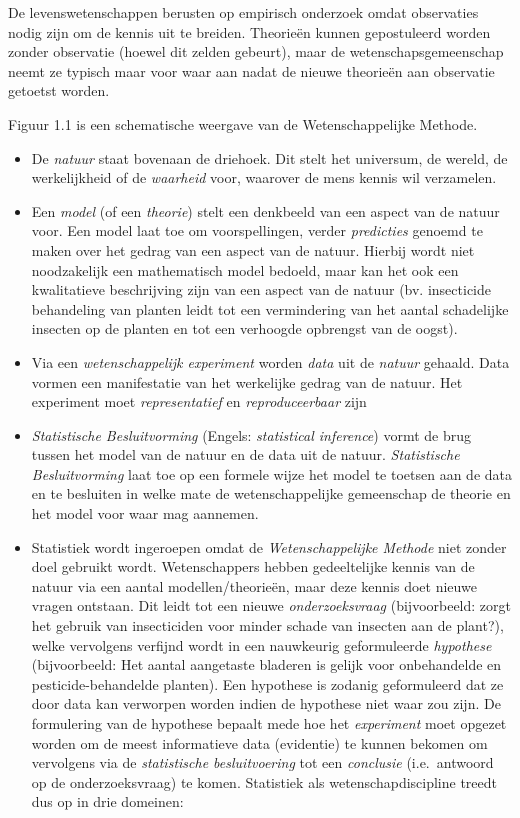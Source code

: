 \documentclass[12pt,dutch,coursenotes]{book}
\theoremstyle{definition}
\theoremstyle{definition}
\theoremstyle{definition}
\theoremstyle{remark}
\begin{document}
De levenswetenschappen berusten op empirisch onderzoek omdat observaties
nodig zijn om de kennis uit te breiden. Theorieën kunnen gepostuleerd
worden zonder observatie (hoewel dit zelden gebeurt), maar de
wetenschapsgemeenschap neemt ze typisch maar voor waar aan nadat de
nieuwe theorieën aan observatie getoetst worden.

Figuur 1.1 is een schematische weergave van de Wetenschappelijke
Methode.

\begin{itemize}
\item
  De \emph{natuur} staat bovenaan de driehoek. Dit stelt het universum,
  de wereld, de werkelijkheid of de \emph{waarheid} voor, waarover de
  mens kennis wil verzamelen.
\item
  Een \emph{model} (of een \emph{theorie}) stelt een denkbeeld van een
  aspect van de natuur voor. Een model laat toe om voorspellingen,
  verder \emph{predicties} genoemd te maken over het gedrag van een
  aspect van de natuur. Hierbij wordt niet noodzakelijk een mathematisch
  model bedoeld, maar kan het ook een kwalitatieve beschrijving zijn van
  een aspect van de natuur (bv. insecticide behandeling van planten
  leidt tot een vermindering van het aantal schadelijke insecten op de
  planten en tot een verhoogde opbrengst van de oogst).
\item
  Via een \emph{wetenschappelijk experiment} worden \emph{data} uit de
  \emph{natuur} gehaald. Data vormen een manifestatie van het werkelijke
  gedrag van de natuur. Het experiment moet \emph{representatief} en
  \emph{reproduceerbaar} zijn
\item
  \emph{Statistische Besluitvorming} (Engels: \emph{statistical
  inference}) vormt de brug tussen het model van de natuur en de data
  uit de natuur. \emph{Statistische Besluitvorming} laat toe op een
  formele wijze het model te toetsen aan de data en te besluiten in
  welke mate de wetenschappelijke gemeenschap de theorie en het model
  voor waar mag aannemen.
\item
  Statistiek wordt ingeroepen omdat de \emph{Wetenschappelijke Methode}
  niet zonder doel gebruikt wordt. Wetenschappers hebben gedeeltelijke
  kennis van de natuur via een aantal modellen/theorieën, maar deze
  kennis doet nieuwe vragen ontstaan. Dit leidt tot een nieuwe
  \emph{onderzoeksvraag} (bijvoorbeeld: zorgt het gebruik van
  insecticiden voor minder schade van insecten aan de plant?), welke
  vervolgens verfijnd wordt in een nauwkeurig geformuleerde
  \emph{hypothese} (bijvoorbeeld: Het aantal aangetaste bladeren is
  gelijk voor onbehandelde en pesticide-behandelde planten). Een
  hypothese is zodanig geformuleerd dat ze door data kan verworpen
  worden indien de hypothese niet waar zou zijn. De formulering van de
  hypothese bepaalt mede hoe het \emph{experiment} moet opgezet worden
  om de meest informatieve data (evidentie) te kunnen bekomen om
  vervolgens via de \emph{statistische besluitvoering} tot een
  \emph{conclusie} (i.e.~antwoord op de onderzoeksvraag) te komen.
  Statistiek als wetenschapdiscipline treedt dus op in drie domeinen:


\end{itemize}
\end{document}
